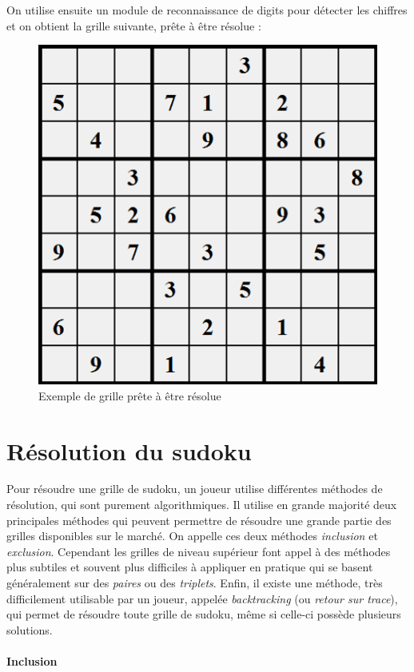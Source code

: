 \documentclass[12pt,a4paper]{report}
\begin{document}
On utilise ensuite un module de reconnaissance de digits pour détecter les chiffres et on obtient la grille suivante, prête à être résolue :

\begin{figure}[!h]
 \center
 \includegraphics[scale=0.45]{../pictures/finished.png}
 \caption{Exemple de grille prête à être résolue}
\end{figure}
\newpage

\section{Résolution du sudoku}
\label{Resolution}
Pour résoudre une grille de sudoku, un joueur utilise différentes méthodes de résolution, qui sont purement algorithmiques. Il utilise en grande majorité deux principales méthodes qui peuvent permettre de résoudre une grande partie des grilles disponibles sur le marché. On appelle ces deux méthodes \emph{inclusion} et \emph{exclusion}. Cependant les grilles de niveau supérieur font appel à des méthodes plus subtiles et souvent plus difficiles à appliquer en pratique qui se basent généralement sur des \emph{paires} ou des \emph{triplets}. Enfin, il existe une méthode, très difficilement utilisable par un joueur, appelée \emph{backtracking} (ou \emph{retour sur trace}), qui permet de résoudre toute grille de sudoku, même si celle-ci possède plusieurs solutions.
\paragraph{Inclusion}
\end{document}
